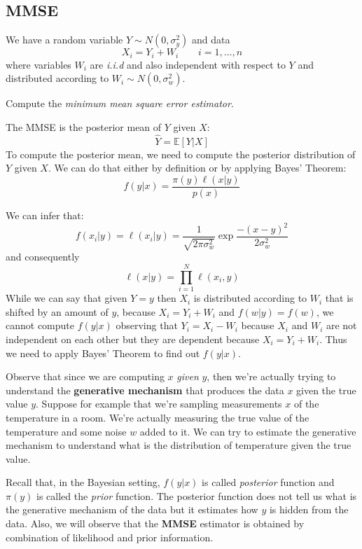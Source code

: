 \subsection{MMSE} \label{sec:ex_2}
\begin{exercise}
    We have a random variable $Y \sim N(0, \sigma^2_y)$ and data
    \[
        X_i = Y_i + W_i \qquad i = 1, \dots, n
    \]
    where variables $W_i$ are \textit{i.i.d} and also independent with respect to $Y$ and distributed according to $W_i \sim N(0, \sigma_w^2)$.

    Compute the \textit{minimum mean square error estimator}.
\end{exercise}

The MMSE is the posterior mean of $Y$ given $X$:
\[
    \hat{Y} = \mathbb{E}\left[ Y | X\right]
\]
To compute the posterior mean, we need to compute the posterior distribution of $Y$ given $X$. We can do that either by definition or by applying Bayes' Theorem:
\[
    f(y|x) = \frac{\pi(y) \ell(x|y)}{p(x)}
\]


We can infer that:
\[
    f(x_i|y) = \ell(x_i|y) = \frac{1}{\sqrt{2\pi \sigma^2_w}} \exp{\frac{-(x-y)^2}{2\sigma_w^2}}
\]
and consequently
\[
    \ell(x|y) = \prod_{i = 1}^{N} \ell(x_i, y)
\]
While we can say that given $Y=y$ then $X_i$ is distributed according to $W_i$ that is shifted by an amount of $y$, because $X_i = Y_i + W_i$ and $f(w|y) = f(w)$, we cannot compute $f(y|x)$ observing that $Y_i = X_i - W_i$ because $X_i$ and $W_i$ are not independent on each other but they are dependent because $X_i = Y_i + W_i$. Thus we need to apply Bayes' Theorem to find out $f(y|x)$.

Observe that since we are computing $x$ \textit{given} $y$, then we're actually trying to understand the \textbf{generative mechanism} that produces the data $x$ given the true value $y$. Suppose for example that we're sampling measurements $x$ of the temperature in a room. We're actually measuring the true value of the temperature and some noise $w$ added to it. We can try to estimate the generative mechanism to understand what is the distribution of temperature given the true value.

Recall that, in the Bayesian setting, $f(y|x)$ is called \textit{posterior} function and $\pi(y)$ is called the \textit{prior} function. The posterior function does not tell us what is the generative mechanism of the data but it estimates how $y$ is hidden from the data. Also, we will observe that the \textbf{MMSE} estimator is obtained by combination of likelihood and prior information.

